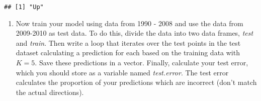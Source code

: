 \documentclass[]{article}
\newenvironment{Shaded}{\begin{snugshade}}{\end{snugshade}}
\newcommand{\CommentTok}[1]{\textcolor[rgb]{0.56,0.35,0.01}{\textit{#1}}}
\newcommand{\ControlFlowTok}[1]{\textcolor[rgb]{0.13,0.29,0.53}{\textbf{#1}}}
\newcommand{\DataTypeTok}[1]{\textcolor[rgb]{0.13,0.29,0.53}{#1}}
\newcommand{\DecValTok}[1]{\textcolor[rgb]{0.00,0.00,0.81}{#1}}
\newcommand{\FloatTok}[1]{\textcolor[rgb]{0.00,0.00,0.81}{#1}}
\newcommand{\KeywordTok}[1]{\textcolor[rgb]{0.13,0.29,0.53}{\textbf{#1}}}
\newcommand{\NormalTok}[1]{#1}
\newcommand{\OperatorTok}[1]{\textcolor[rgb]{0.81,0.36,0.00}{\textbf{#1}}}
\newcommand{\StringTok}[1]{\textcolor[rgb]{0.31,0.60,0.02}{#1}}
\providecommand{\tightlist}{%
  \setlength{\itemsep}{0pt}\setlength{\parskip}{0pt}}
\begin{document}
\begin{Shaded}
\end{Shaded}

\begin{verbatim}
## [1] "Up"
\end{verbatim}

\begin{enumerate}
\def\labelenumi{\arabic{enumi}.}
\setcounter{enumi}{2}
\tightlist
\item
  Now train your model using data from 1990 - 2008 and use the data from
  2009-2010 as test data. To do this, divide the data into two data
  frames, \emph{test} and \emph{train}. Then write a loop that iterates
  over the test points in the test dataset calculating a prediction for
  each based on the training data with \(K=5\). Save these predictions
  in a vector. Finally, calculate your test error, which you should
  store as a variable named \emph{test.error}. The test error calculates
  the proportion of your predictions which are incorrect (don't match
  the actual directions).
\end{enumerate}
\end{document}
